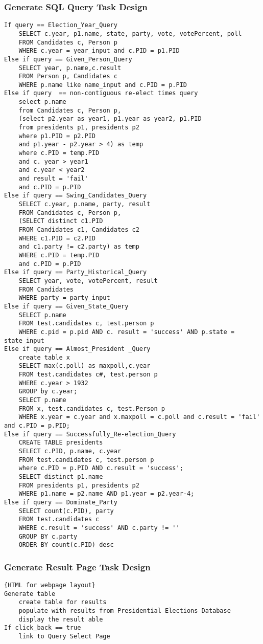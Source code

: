 \documentclass{article}
\begin{document}
\subsubsection{Generate SQL Query Task Design}
\begin{lstlisting}
If query == Election_Year_Query
    SELECT c.year, p1.name, state, party, vote, votePercent, poll
    FROM Candidates c, Person p
    WHERE c.year = year_input and c.PID = p1.PID
Else if query == Given_Person_Query
    SELECT year, p.name,c.result
    FROM Person p, Candidates c
    WHERE p.name like name_input and c.PID = p.PID   
Else if query  == non-contiguous re-elect times query
    select p.name
    from Candidates c, Person p,
    (select p2.year as year1, p1.year as year2, p1.PID
    from presidents p1, presidents p2
    where p1.PID = p2.PID
    and p1.year - p2.year > 4) as temp
    where c.PID = temp.PID
    and c. year > year1
    and c.year < year2
    and result = 'fail'
    and c.PID = p.PID
Else if query == Swing_Candidates_Query
    SELECT c.year, p.name, party, result
    FROM Candidates c, Person p,
    (SELECT distinct c1.PID 
    FROM Candidates c1, Candidates c2
    WHERE c1.PID = c2.PID
    and c1.party != c2.party) as temp
    WHERE c.PID = temp.PID
    and c.PID = p.PID
Else if query == Party_Historical_Query
    SELECT year, vote, votePercent, result
    FROM Candidates 
    WHERE party = party_input
Else if query == Given_State_Query
    SELECT p.name
    FROM test.candidates c, test.person p
    WHERE c.pid = p.pid AND c. result = 'success' AND p.state = state_input
Else if query == Almost_President _Query
    create table x
    SELECT max(c.poll) as maxpoll,c.year
    FROM test.candidates c#, test.person p
    WHERE c.year > 1932
    GROUP by c.year;
    SELECT p.name
    FROM x, test.candidates c, test.Person p
    WHERE x.year = c.year and x.maxpoll = c.poll and c.result = 'fail' and c.PID = p.PID;
Else if query == Successfully_Re-election_Query
    CREATE TABLE presidents
    SELECT c.PID, p.name, c.year
    FROM test.candidates c, test.person p
    where c.PID = p.PID AND c.result = 'success';
    SELECT distinct p1.name
    FROM presidents p1, presidents p2
    WHERE p1.name = p2.name AND p1.year = p2.year-4;
Else if query == Dominate_Party
    SELECT count(c.PID), party
    FROM test.candidates c
    WHERE c.result = 'success' AND c.party != ''
    GROUP BY c.party
    ORDER BY count(c.PID) desc
\end{lstlisting}

\subsubsection{Generate Result Page Task Design}
\begin{lstlisting}
{HTML for webpage layout}
Generate table
    create table for results
    populate with results from Presidential Elections Database
    display the result able
If click_back == true
    link to Query Select Page  
\end{lstlisting}
\end{document}
